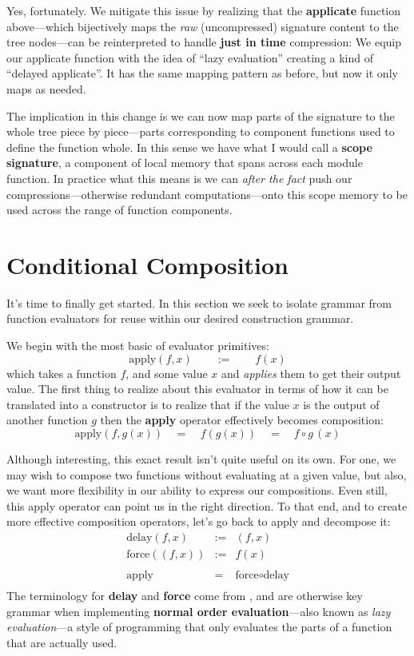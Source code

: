 \documentclass[twoside]{article}
\newcommand{\strong}[1]{{\bfseries #1}}
\newcommand{\qeq}{\ensuremath{\quad =\quad}}
\newcommand{\qqdefeq}{\ensuremath{\qquad :=\qquad}}
\newcommand{\delay}{\mbox{delay}}
\newcommand{\force}{\mbox{force}}
\newcommand{\apply}{\mbox{apply}}
\begin{document}
Yes, fortunately. We mitigate this issue by realizing that the \strong{applicate} function above---which bijectively maps
the \emph{raw} (uncompressed) signature content to the tree nodes---can be reinterpreted to handle \strong{just in time}
compression: We equip our applicate function with the idea of ``lazy evaluation'' creating a kind of ``delayed applicate''.
It has the same mapping pattern as before, but now it only maps as needed.

The implication in this change is we can now map parts of the signature to the whole tree piece by piece---parts
corresponding to component functions used to define the function whole. In this sense we have what I would
call a \strong{scope signature}, a component of local memory that spans across each module function. In
practice what this means is we can \emph{after the fact} push our compressions---otherwise redundant
computations---onto this scope memory to be used across the range of function components.

\section*{Conditional Composition}

It's time to finally get started. In this section we seek to isolate grammar
from function evaluators for reuse within our desired construction grammar.

We begin with the most basic of evaluator primitives:
$$ \apply(f, x) \qqdefeq f(x) $$
which takes a function $ f $, and some value $ x $ and \emph{applies} them to get their output value. The first thing
to realize about this evaluator in terms of how it can be translated into a constructor is to realize that if the value
$ x $ is the output of another function $ g $ then the \strong{apply} operator effectively becomes composition:
$$ \apply(f, g(x)) \qeq f(g(x)) \qeq f \circ g\,(x) $$

Although interesting, this exact result isn't quite useful on its own. For one, we may wish to compose two functions
without evaluating at a given value, but also, we want more flexibility in our ability to express our compositions.
Even still, this apply operator can point us in the right direction. To that end, and to create more effective
composition operators, let's go back to apply and decompose it:
$$ \begin{array}{lrl}
\delay(f, x)		& := & (f, x)				\\
\force((f, x))		& := & f(x)				\\
								\\
\apply			&  = & \force \circ \delay		\\
\end{array} $$
The terminology for \strong{delay} and \strong{force} come from \cite{sicp}, and are otherwise key grammar when
implementing \strong{normal order evaluation}---also known as \emph{lazy evaluation}---a style of programming
that only evaluates the parts of a function that are actually used.
\end{document}
